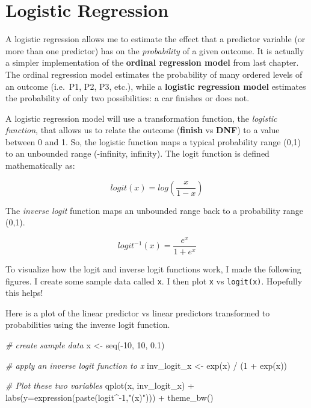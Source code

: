 \documentclass[
]{book}
\newenvironment{Shaded}{\begin{snugshade}}{\end{snugshade}}
\newcommand{\AttributeTok}[1]{\textcolor[rgb]{0.77,0.63,0.00}{#1}}
\newcommand{\CommentTok}[1]{\textcolor[rgb]{0.56,0.35,0.01}{\textit{#1}}}
\newcommand{\DecValTok}[1]{\textcolor[rgb]{0.00,0.00,0.81}{#1}}
\newcommand{\FloatTok}[1]{\textcolor[rgb]{0.00,0.00,0.81}{#1}}
\newcommand{\FunctionTok}[1]{\textcolor[rgb]{0.00,0.00,0.00}{#1}}
\newcommand{\NormalTok}[1]{#1}
\newcommand{\OtherTok}[1]{\textcolor[rgb]{0.56,0.35,0.01}{#1}}
\newcommand{\SpecialCharTok}[1]{\textcolor[rgb]{0.00,0.00,0.00}{#1}}
\newcommand{\StringTok}[1]{\textcolor[rgb]{0.31,0.60,0.02}{#1}}
\begin{document}
\hypertarget{logistic-regression}{%
\section{Logistic Regression}\label{logistic-regression}}

A logistic regression allows me to estimate the effect that a predictor variable (or more than one predictor) has on the \emph{probability} of a given outcome. It is actually a simpler implementation of the \textbf{ordinal regression model} from last chapter. The ordinal regression model estimates the probability of many ordered levels of an outcome (i.e.~P1, P2, P3, etc.), while a \textbf{logistic regression model} estimates the probability of only two possibilities: a car finishes or does not.

A logistic regression model will use a transformation function, the \emph{logistic function}, that allows us to relate the outcome (\textbf{finish} vs \textbf{DNF}) to a value between 0 and 1. So, the logistic function maps a typical probability range (0,1) to an unbounded range (-infinity, infinity). The logit function is defined mathematically as:

\[logit(x) = log(\frac{x}{1-x})\]

The \emph{inverse logit} function maps an unbounded range back to a probability range (0,1).

\[logit^{-1}(x) = \frac{e^{x}}{1 + e^{x}}\]

To visualize how the logit and inverse logit functions work, I made the following figures. I create some sample data called \texttt{x}. I then plot \texttt{x} vs \texttt{logit(x)}. Hopefully this helps!

Here is a plot of the linear predictor vs linear predictors transformed to probabilities using the inverse logit function.

\begin{Shaded}
\begin{Highlighting}[]
\CommentTok{\# create sample data}
\NormalTok{x }\OtherTok{\textless{}{-}} \FunctionTok{seq}\NormalTok{(}\SpecialCharTok{{-}}\DecValTok{10}\NormalTok{, }\DecValTok{10}\NormalTok{, }\FloatTok{0.1}\NormalTok{)}

\CommentTok{\# apply an inverse logit function to x}
\NormalTok{inv\_logit\_x }\OtherTok{\textless{}{-}} \FunctionTok{exp}\NormalTok{(x) }\SpecialCharTok{/}\NormalTok{ (}\DecValTok{1} \SpecialCharTok{+} \FunctionTok{exp}\NormalTok{(x))}

\CommentTok{\# Plot these two variables}
\FunctionTok{qplot}\NormalTok{(x, inv\_logit\_x) }\SpecialCharTok{+}
  \FunctionTok{labs}\NormalTok{(}\AttributeTok{y=}\FunctionTok{expression}\NormalTok{(}\FunctionTok{paste}\NormalTok{(logit}\SpecialCharTok{\^{}{-}}\DecValTok{1}\NormalTok{,}\StringTok{"(x)"}\NormalTok{))) }\SpecialCharTok{+}
  \FunctionTok{theme\_bw}\NormalTok{()}
\end{Highlighting}
\end{Shaded}
\end{document}

